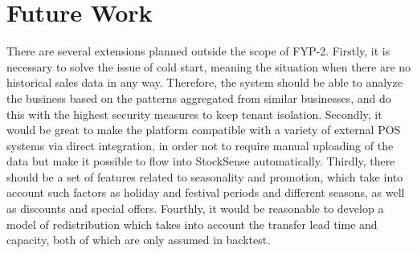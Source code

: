 \documentclass{StockSense}
\begin{document}
\section{Future Work}

There are several extensions planned outside the scope of FYP-2. Firstly, it is necessary to solve the issue of cold start, meaning the situation when there are no historical sales data in any way. Therefore, the system should be able to analyze the business based on the patterns aggregated from similar businesses, and do this with the highest security measures to keep tenant isolation. Secondly, it would be great to make the platform compatible with a variety of external POS systems via direct integration, in order not to require manual uploading of the data but make it possible to flow into StockSense automatically. Thirdly, there should be a set of features related to seasonality and promotion, which take into account such factors as holiday and festival periods and different seasons, as well as discounts and special offers. Fourthly, it would be reasonable to develop a model of redistribution which takes into account the transfer lead time and capacity, both of which are only assumed in backtest.



\end{document}
